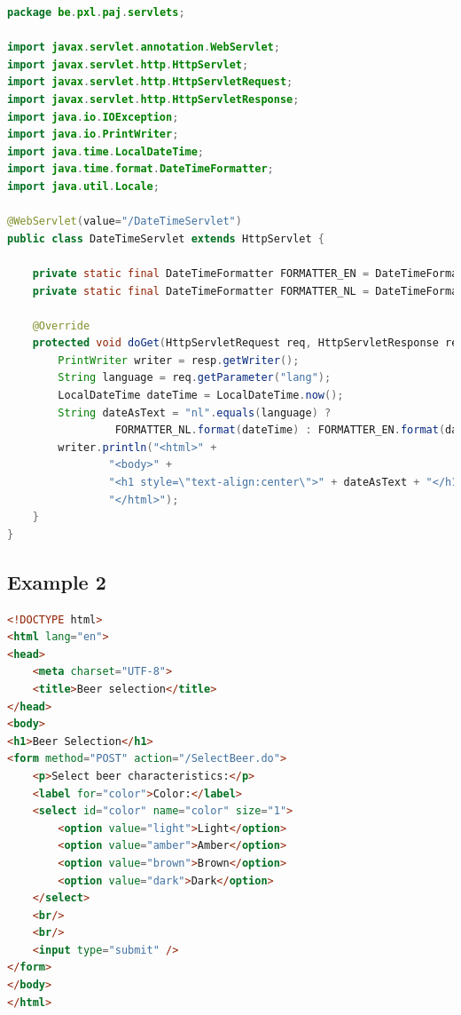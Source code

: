 \begin{lstlisting}[language=java, frame=single]
package be.pxl.paj.servlets;

import javax.servlet.annotation.WebServlet;
import javax.servlet.http.HttpServlet;
import javax.servlet.http.HttpServletRequest;
import javax.servlet.http.HttpServletResponse;
import java.io.IOException;
import java.io.PrintWriter;
import java.time.LocalDateTime;
import java.time.format.DateTimeFormatter;
import java.util.Locale;

@WebServlet(value="/DateTimeServlet")
public class DateTimeServlet extends HttpServlet {

	private static final DateTimeFormatter FORMATTER_EN = DateTimeFormatter.ofPattern("EEEE dd/MM/yyyy HH:mm:ss", Locale.ENGLISH);
	private static final DateTimeFormatter FORMATTER_NL = DateTimeFormatter.ofPattern("EEEE dd/MM/yyyy HH:mm:ss", new Locale("nl"));

	@Override
	protected void doGet(HttpServletRequest req, HttpServletResponse resp) throws IOException {
		PrintWriter writer = resp.getWriter();
		String language = req.getParameter("lang");
		LocalDateTime dateTime = LocalDateTime.now();
		String dateAsText = "nl".equals(language) ? 
		         FORMATTER_NL.format(dateTime) : FORMATTER_EN.format(dateTime);
		writer.println("<html>" +
				"<body>" +
				"<h1 style=\"text-align:center\">" + dateAsText + "</h1></body>" +
				"</html>");
	}
}
\end{lstlisting}


\subsection{Example 2}


\begin{lstlisting}[frame=single, language=html]
<!DOCTYPE html>
<html lang="en">
<head>
	<meta charset="UTF-8">
	<title>Beer selection</title>
</head>
<body>
<h1>Beer Selection</h1>
<form method="POST" action="/SelectBeer.do">
	<p>Select beer characteristics:</p>
	<label for="color">Color:</label>
	<select id="color" name="color" size="1">
		<option value="light">Light</option>
		<option value="amber">Amber</option>
		<option value="brown">Brown</option>
		<option value="dark">Dark</option>
	</select>
	<br/>
	<br/>
	<input type="submit" />
</form>
</body>
</html>
\end{lstlisting}

